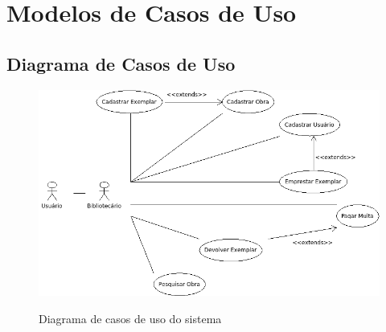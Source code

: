 \documentclass[
	12pt,				%
	openright,			%
	oneside,			%
	a4paper,			%
	english,			%
	brazil				%
	]{abntex2}
\begin{document}
\frenchspacing 


\imprimircapa

\imprimirfolhaderosto*

\tableofcontents*
\cleardoublepage



\textual


\chapter{Modelos de Casos de Uso}

\section{Diagrama de Casos de Uso}

\begin{figure}[H]
\includegraphics[width=1\textwidth]{useCase}
\label{fig:figura1}
\caption{\small Diagrama de casos de uso do sistema}
\end{figure}
\end{document}
